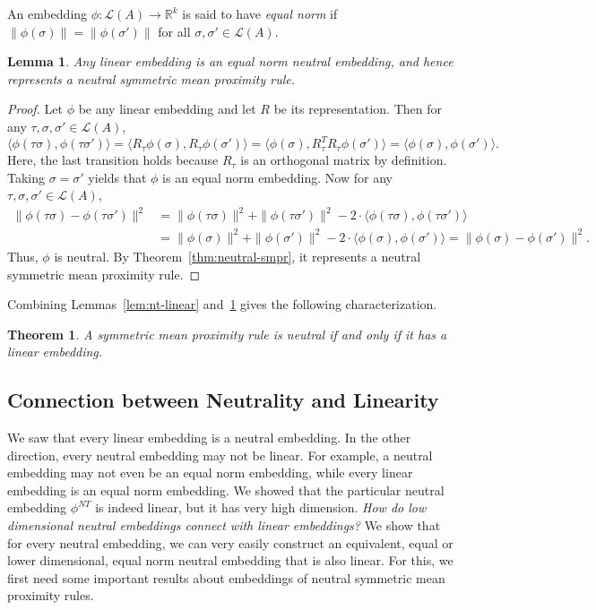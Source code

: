 \documentclass[10pt,letterpaper]{article}
\newcommand{\calL}{{\mathcal{L}}}
\newcommand{\rank}{{\calL(A)}}
\newtheorem{theorem}{Theorem}
\newtheorem{lemma}{Lemma}
\newenvironment{definition}[1][Definition]{\begin{trivlist}
\item[\hskip \labelsep {\bfseries #1}]}{\end{trivlist}}
\newcommand{\nt}{NT}
\begin{document}
\begin{definition}[Equal Norm Embedding]
An embedding $\phi : \rank \rightarrow \mathbb{R}^k$ is said to have \emph{equal norm} if $\|\phi(\sigma)\| = \|\phi(\sigma')\|$ for all $\sigma,\sigma' \in \rank$.
\end{definition}

\begin{lemma}
Any linear embedding is an equal norm neutral embedding, and hence represents a neutral symmetric mean proximity rule.
\label{lem:linear-neutral}
\end{lemma}
\begin{proof}
Let $\phi$ be any linear embedding and let $R$ be its representation. Then for any $\tau,\sigma,\sigma' \in \rank$,
$$
\langle \phi(\tau \sigma), \phi(\tau \sigma') \rangle = \langle R_{\tau}\phi(\sigma), R_{\tau}\phi(\sigma') \rangle = \langle \phi(\sigma), R_{\tau}^T R_{\tau}\phi(\sigma') \rangle = \langle \phi(\sigma), \phi(\sigma') \rangle.
$$
Here, the last transition holds because $R_{\tau}$ is an orthogonal matrix by definition. Taking $\sigma = \sigma'$ yields that $\phi$ is an equal norm embedding. Now for any $\tau,\sigma,\sigma' \in \rank$,
\begin{align*}
\|\phi(\tau \sigma)-\phi(\tau \sigma')\|^2 &= \|\phi(\tau \sigma)\|^2 + \|\phi(\tau \sigma')\|^2 - 2\cdot \langle \phi(\tau \sigma), \phi(\tau \sigma') \rangle \\
&= \|\phi(\sigma)\|^2 + \|\phi(\sigma')\|^2 - 2\cdot \langle \phi(\sigma), \phi(\sigma') \rangle = \|\phi(\sigma)-\phi(\sigma')\|^2.
\end{align*}
Thus, $\phi$ is neutral. By Theorem~\ref{thm:neutral-smpr}, it represents a neutral symmetric mean proximity rule.
\end{proof}

Combining Lemmas~\ref{lem:nt-linear} and~\ref{lem:linear-neutral} gives the following characterization.
\begin{theorem}
A symmetric mean proximity rule is neutral if and only if it has a linear embedding.
\label{thm:linear-char}
\end{theorem}

\subsection{Connection between Neutrality and Linearity}

We saw that every linear embedding is a neutral embedding. In the other direction, every neutral embedding may not be linear. For example, a neutral embedding may not even be an equal norm embedding, while every linear embedding is an equal norm embedding. We showed that the particular neutral embedding $\phi^{\nt}$ is indeed linear, but it has very high dimension. \emph{How do low dimensional neutral embeddings connect with linear embeddings?} We show that for every neutral embedding, we can very easily construct an equivalent, equal or lower dimensional, equal norm neutral embedding that is also linear. For this, we first need some important results about embeddings of neutral symmetric mean proximity rules.
\end{document}
